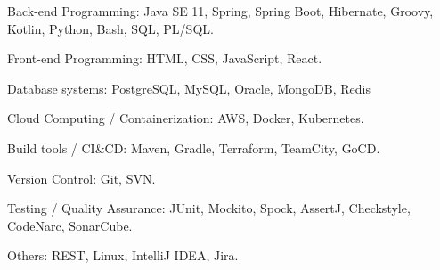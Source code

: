 

\begin{cvskills}


  \cvskill
    {Back-end Programming:} %
    {Java SE 11, Spring, Spring Boot, Hibernate, Groovy, Kotlin, Python, Bash, SQL, PL/SQL.} %

  \cvskill
    {Front-end Programming:} %
    {HTML, CSS, JavaScript, React.} %

  \cvskill
    {Database systems:} %
    {PostgreSQL, MySQL, Oracle, MongoDB, Redis} %

  \cvskill
    {Cloud Computing / Containerization:} %
    {AWS, Docker, Kubernetes.} %

  \cvskill
    {Build tools / CI\&CD:} %
    {Maven, Gradle, Terraform, TeamCity, GoCD.} %

  \cvskill
    {Version Control:} %
    {Git, SVN.} %

  \cvskill
    {Testing / Quality Assurance:} %
    {JUnit, Mockito, Spock, AssertJ, Checkstyle, CodeNarc, SonarCube.} %
    
  \cvskill
    {Others:} %
    {REST, Linux, IntelliJ IDEA, Jira.} %



\end{cvskills}
